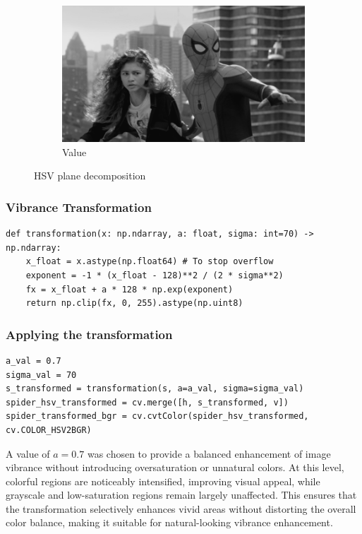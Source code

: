 \documentclass[11pt]{article}
\begin{document}
\begin{figure}[H]
\begin{subfigure}{0.3\textwidth}
        \includegraphics[width=\textwidth]{resources/spider_value.png}
        \caption{Value}
    \end{subfigure}
    \caption{HSV plane decomposition}
\end{figure}

\subsubsection*{Vibrance Transformation}

\begin{lstlisting}[style=pythonstyle]
def transformation(x: np.ndarray, a: float, sigma: int=70) -> np.ndarray:
    x_float = x.astype(np.float64) # To stop overflow
    exponent = -1 * (x_float - 128)**2 / (2 * sigma**2)
    fx = x_float + a * 128 * np.exp(exponent)
    return np.clip(fx, 0, 255).astype(np.uint8)
\end{lstlisting}

\subsubsection*{Applying the transformation}
\begin{lstlisting}[style=pythonstyle]
a_val = 0.7  
sigma_val = 70
s_transformed = transformation(s, a=a_val, sigma=sigma_val)
spider_hsv_transformed = cv.merge([h, s_transformed, v])
spider_transformed_bgr = cv.cvtColor(spider_hsv_transformed, cv.COLOR_HSV2BGR)
\end{lstlisting}

A value of $a = 0.7$ was chosen to provide a balanced enhancement of image vibrance without introducing oversaturation or unnatural colors. At this level, colorful regions are noticeably intensified, improving visual appeal, while grayscale and low-saturation regions remain largely unaffected. This ensures that the transformation selectively enhances vivid areas without distorting the overall color balance, making it suitable for natural-looking vibrance enhancement.
\end{document}
